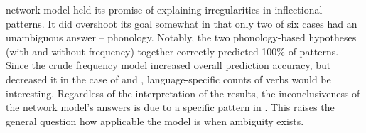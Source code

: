 
 network model held its promise of explaining irregularities in inflectional patterns.
It  did overshoot its goal somewhat in that only two of six cases had an unambiguous answer -- phonology.
Notably, the two phonology-based hypotheses (with and without frequency) together correctly predicted 100\% of patterns.
Since the crude frequency model increased overall prediction accuracy, but decreased it in the case of \carijo and \yukpa, language-specific counts of  verbs would be interesting.
Regardless of the interpretation of the results, the inconclusiveness of the network model's answers is due to a specific pattern in \PC.
This raises the general question how applicable the model is when ambiguity exists.

%
%

